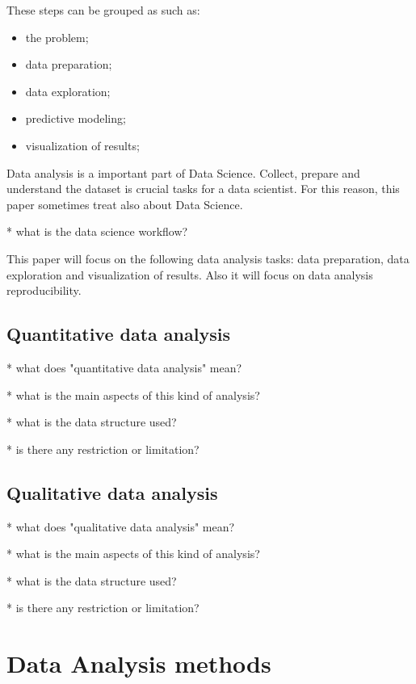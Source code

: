 \documentclass[12pt,a4paper]{amsart}
\numberwithin{equation}{section}
\theoremstyle{plain}
\theoremstyle{definition}
\begin{document}
These steps can be grouped as \cite{cuesta2016practical} such as:

\begin{itemize}
\item the problem;
\item data preparation;
\item data exploration;
\item predictive modeling;
\item visualization of results;
\end{itemize}

Data analysis is a important part of Data Science. Collect, prepare and understand the dataset is crucial tasks for a data scientist. For this reason, this paper sometimes treat also about Data Science. 

* what is the data science workflow?

This paper will focus on the following data analysis tasks: data preparation, data exploration and visualization of results. Also it will focus on data analysis reproducibility.

\subsection{Quantitative data analysis}\label{quantitative-analysis}

* what does "quantitative data analysis" mean?

* what is the main aspects of this kind of analysis?

* what is the data structure used?

* is there any restriction or limitation?

\subsection{Qualitative data analysis}\label{qualitative-analysis}

* what does "qualitative data analysis" mean?

* what is the main aspects of this kind of analysis?

* what is the data structure used?

* is there any restriction or limitation?


\section{Data Analysis methods}\label{methods}
\end{document}
